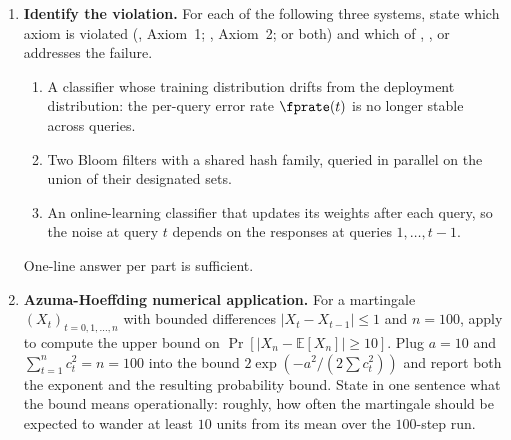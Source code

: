 \begin{enumerate}


\item \exstar
\label{ex:ch16-1}
\textbf{Identify the violation.}
For each of the following three systems, state which axiom is
violated (, Axiom~1; ,
Axiom~2; or both) and which of ,
, or 
addresses the failure.
\begin{enumerate}
  \item[(a)] A classifier whose training distribution drifts from
    the deployment distribution: the per-query error rate $\fprate(t)$
    is no longer stable across queries.
  \item[(b)] Two Bloom filters with a shared hash family, queried
    in parallel on the union of their designated sets.
  \item[(c)] An online-learning classifier that updates its weights
    after each query, so the noise at query $t$ depends on the
    responses at queries $1, \ldots, t - 1$.
\end{enumerate}
One-line answer per part is sufficient.

\item \exstar
\label{ex:ch16-2}
\textbf{Azuma-Hoeffding numerical application.}
For a martingale $(X_t)_{t = 0, 1, \ldots, n}$ with bounded
differences $|X_t - X_{t-1}| \le 1$ and $n = 100$, apply
 to compute the upper bound on
$\Pr[|X_n - \mathbb{E}[X_n]| \ge 10]$. Plug $a = 10$ and
$\sum_{t = 1}^{n} c_t^2 = n = 100$ into the bound $2 \exp(-a^2 / (2
\sum c_t^2))$ and report both the exponent and the resulting
probability bound. State in one sentence what the bound means
operationally: roughly, how often the martingale should be expected
to wander at least $10$ units from its mean over the $100$-step run.


\end{enumerate}
